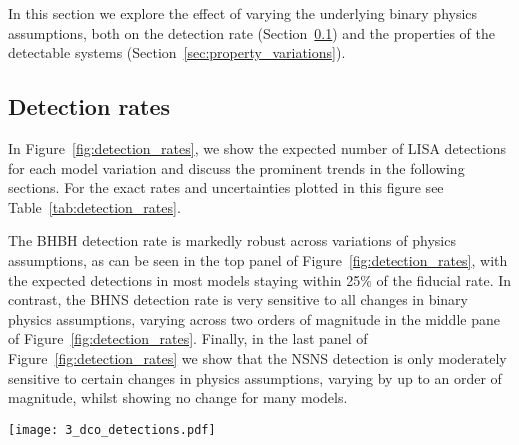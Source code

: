 In this section we explore the effect of varying the underlying binary physics assumptions, both on the detection rate (Section~\ref{sec:detection_rate_analysis}) and the properties of the detectable systems (Section~\ref{sec:property_variations}).

\subsection{Detection rates}\label{sec:detection_rate_analysis}
In Figure~\ref{fig:detection_rates}, we show the expected number of LISA detections for each model variation and discuss the prominent trends in the following sections. For the exact rates and uncertainties plotted in this figure see Table~\ref{tab:detection_rates}.

The BHBH detection rate is markedly robust across variations of physics assumptions, as can be seen in the top panel of Figure~\ref{fig:detection_rates}, with the expected detections in most models staying within 25\% of the fiducial rate. In contrast, the BHNS detection rate is very sensitive to all changes in binary physics assumptions, varying across two orders of magnitude in the middle pane of Figure~\ref{fig:detection_rates}. Finally, in the last panel of Figure~\ref{fig:detection_rates} we show that the NSNS detection is only moderately sensitive to certain changes in physics assumptions, varying by up to an order of magnitude, whilst showing no change for many models.

\begin{figure*}[p]
    \centering
    \texttt{[image: 3\_dco\_detections.pdf]}
    \caption{The number of expected detections in the LISA mission for different DCO types and model variations. Error bars show the 1- (solid) and 2-$\sigma$ (dotted) Poisson uncertainties. An arrow indicates that the error bar extends to zero. The left axis and grid lines show the number of detections in a 4-year LISA mission and the right axis shows an approximation of the number of detections in a 10-year mission (we scale the axis by $\sqrt{T_{\rm obs}}$, see Table~\ref{tab:detection_rates} for exact rates). Each model is described in further detail in Table~\ref{tab:physics_variations} and details of the fiducial assumptions are in Section~\ref{app:fiducial_physics}. See Sec.~\ref{sec:detection_rate_analysis} for a discussion. }
    \label{fig:detection_rates}
\end{figure*}

